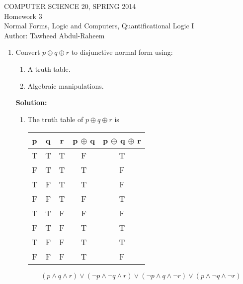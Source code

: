 \documentclass[12pt]{article}
\begin{document}
\begin{center}
    COMPUTER SCIENCE 20, SPRING 2014 \\
    Homework 3\\
    Normal Forms, Logic and Computers, Quantificational Logic I\\
    Author: Tawheed Abdul-Raheem
\end{center}

\smallskip


\begin{enumerate}

    \item 

        Convert $p \oplus q \oplus r$ to disjunctive normal form using:
        \begin{enumerate}
            \item A truth table.
            \item Algebraic manipulations. 
        \end{enumerate}

        \textbf{Solution: } \\
        \begin{enumerate}
        \item
        The truth table of $p \oplus q \oplus r$ is
        \begin{table}[h]
            \centering
            \begin{tabular}{|c|c|c|c|c|}
                \hline
                p & q & r & p $\oplus$ q & p $\oplus$ q $\oplus$ r \\ \hline
                T & T & T & F & T  \\
                F & T & T & T & F  \\
                T & F & T & T & F  \\
                F & F & T & F & T  \\
                T & T & F & F & F  \\
                F & T & F & T & T  \\
                T & F & F & T & T  \\
                F & F & F & T & F  \\ \hline
            \end{tabular}
        \end{table}
        \[ (p \wedge q \wedge r) \vee (\neg p \wedge \neg q \wedge r) \vee (\neg p \wedge q \wedge \neg r) \vee (p \wedge \neg q \wedge \neg r) \]


\end{enumerate}
\end{enumerate}
\end{document}
